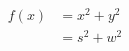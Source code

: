 \documentclass[12pt,a4paper]{article}
\begin{document}
\begin{equation*}
\begin{aligned}
f(x)&=x^2+y^2\\
&=s^2+w^2
\end{aligned}
\end{equation*}














































\cite{tam19912d}

\end{document}
